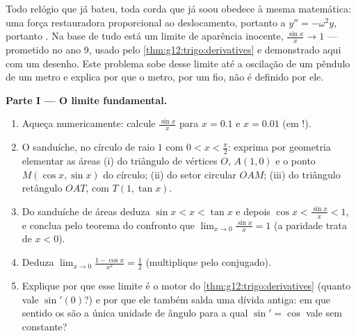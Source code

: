 \begin{problem}
\label{pb:g12:trigo:1}
Todo relógio que já bateu, toda corda que já soou obedece à mesma
matemática: uma força restauradora proporcional ao deslocamento,
portanto a  $y'' = -\omega^2 y$, portanto . Na base
de tudo está um limite de aparência inocente,
$\frac{\sin x}{x} \to 1$ --- prometido no ano 9, usado pelo
\cref{thm:g12:trigo:derivatives} e demonstrado aqui com um
desenho. Este problema sobe desse limite até a oscilação de um
pêndulo de um metro e explica por que o metro, por um fio, não é
definido por ele.

\medskip
\noindent\textbf{Parte I --- O limite fundamental.}
\begin{enumerate}
  \item Aqueça numericamente: calcule $\frac{\sin x}{x}$ para
        $x = 0.1$ e $x = 0.01$ (em !).
  \item O sanduíche, no círculo de raio $1$ com
        $0 < x < \frac\pi2$: exprima por geometria elementar as
        áreas (i) do triângulo de vértices $O$, $A(1,0)$ e o
        ponto $M(\cos x, \sin x)$ do círculo; (ii) do setor
        circular $OAM$; (iii) do triângulo retângulo $OAT$, com
        $T(1, \tan x)$.
  \item Do sanduíche de áreas deduza $\sin x < x < \tan x$ e
        depois $\cos x < \frac{\sin x}{x} < 1$, e conclua pelo
        teorema do confronto que
        $\lim_{x \to 0} \frac{\sin x}{x} = 1$ (a paridade trata
        de $x < 0$).
  \item Deduza $\lim_{x \to 0} \frac{1 - \cos x}{x^2} =
        \frac12$ (multiplique pelo conjugado).
  \item Explique por que esse limite é o motor do
        \cref{thm:g12:trigo:derivatives} (quanto vale
        $\sin'(0)$?) e por que ele também salda uma dívida
        antiga: em que sentido os \emph{} são a única
        unidade de ângulo para a qual $\sin' = \cos$ vale sem
        constante?
\end{enumerate}


\end{problem}
